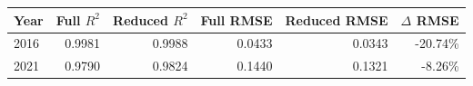 \begin{tabular}{@{}lrrrrr@{}}
\toprule
Year & Full $R^2$ & Reduced $R^2$ & Full RMSE & Reduced RMSE & $\Delta$ RMSE \\
\midrule
2016 & 0.9981 & 0.9988 & 0.0433 & 0.0343 & -20.74\% \\
2021 & 0.9790 & 0.9824 & 0.1440 & 0.1321 & -8.26\% \\
\bottomrule
\end{tabular}
